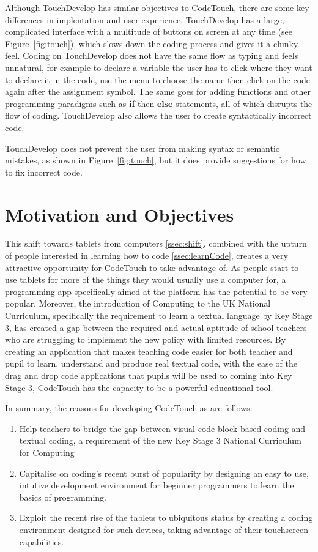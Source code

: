 \documentclass[ %
                    author={Jonathan Rankin},
                supervisor={Dr. David May, Dr. Ian Holyer},
                    degree={MEng},
                     title={CodeTouch},
                  subtitle={A Revolutionary Way To Program Real Code On Touch Screen Devices},
                      type={enterprise},
                      year={2015 } ]{dissertation}
\begin{document}
Although TouchDevelop has similar objectives to CodeTouch, there are some key differences in implentation and user experience. TouchDevelop has a large, complicated interface with a multitude of buttons on screen at any time (see Figure~\ref{fig:touch}), which slows down the coding process and gives it a clunky feel. Coding on TouchDevelop does not have the same flow as typing and feels unnatural, for example to declare a variable the user has to click where they want to declare it in the code, use the menu to choose the name then click on the code again after the assignment symbol. The same goes for adding functions and other programming paradigms such as \textbf{if} then \textbf{else} statements, all of which disrupts the flow of coding. TouchDevelop also allows the user to create syntactically incorrect code. 

TouchDevelop does not prevent the user from making syntax or semantic mistakes, as shown in Figure~\ref{fig:touch}, but it does provide suggestions for how to fix incorrect code. 





\section {Motivation and Objectives}
This shift towards tablets from computers \ref{ssec:shift}, combined with the upturn of people interested in learning how to code \ref{ssec:learnCode}, creates a very attractive opportunity for CodeTouch to take advantage of. As people start to use tablets for more of the things they would usually use a computer for, a programming app specifically aimed at the platform has the potential to be very popular. Moreover, the introduction of Computing to the UK National Curriculum, specifically the requirement to learn a textual language by Key Stage 3, has created a gap between the required and actual aptitude of school teachers who are struggling to implement the new policy with limited resources. By creating an application that makes teaching code easier for both teacher and pupil to learn, understand and produce real textual code, with the ease of the drag and drop code applications that pupils will be used to coming into Key Stage 3, CodeTouch has the capacity to be a powerful educational tool. 




In summary, the reasons for developing CodeTouch as are follows:

\begin{enumerate}
\item Help teachers to bridge the gap between visual code-block based coding and textual coding, a requirement of the new Key Stage 3 National Curriculum for Computing
\item Capitalise on coding's recent burst of popularity by designing an easy to use, intutive development environment for beginner programmers to learn the basics of programming.
\item Exploit the recent rise of the tablets to ubiquitous status by creating a coding environment designed for such devices, taking advantage of their touchscreen capabilities. 
\end{enumerate}
\end{document}
